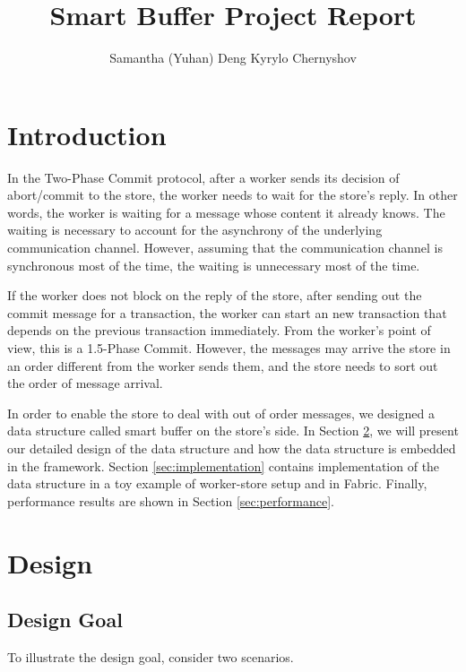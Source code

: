 \documentclass{article}
\title{Smart Buffer Project Report}
\author{
  Samantha (Yuhan) Deng
   \And
 Kyrylo Chernyshov
}
\begin{document}
\maketitle





\section{Introduction}
In the Two-Phase Commit protocol, after a worker sends its decision of
abort/commit to the store, the worker needs to wait for the store's reply. In
other words, the worker is waiting for a message whose content it already knows.
The waiting is necessary to account for the asynchrony of the underlying
communication channel. However, assuming that the communication channel is
synchronous most of the time, the waiting is unnecessary most of the time.

If the worker does not block on the reply of the store, after sending out the
commit message for a transaction, the worker can start an new transaction that
depends on the previous transaction immediately. From the worker's point of
view, this is a 1.5-Phase Commit. However, the messages may arrive the store in
an order different from the worker sends them, and the store needs to sort out
the order of message arrival. 

In order to enable the store to deal with out of order messages, we designed a
data structure called smart buffer on the store's side. In Section
\ref{sec:design}, we will present our detailed design of the data structure and
how the data structure is embedded in the framework. Section
\ref{sec:implementation} contains implementation of the data structure in a toy
example of worker-store setup and in Fabric. Finally, performance results are
shown in Section \ref{sec:performance}.

\section{Design}
\label{sec:design}

\subsection{Design Goal}
To illustrate the design goal, consider two scenarios.
\end{document}
